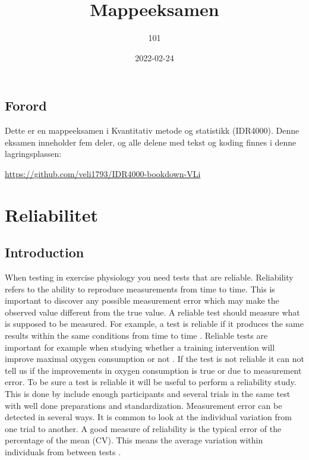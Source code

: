 \documentclass[
]{book}
\title{Mappeeksamen}
\author{101}
\date{2022-02-24}
\begin{document}
\maketitle

{
\setcounter{tocdepth}{1}
\tableofcontents
}
\hypertarget{forord}{%
\section{Forord}\label{forord}}

Dette er en mappeeksamen i Kvantitativ metode og statistikk (IDR4000). Denne eksamen inneholder fem deler, og alle delene med tekst og koding finnes i denne lagringsplassen:

\url{https://github.com/veli1793/IDR4000-bookdown-VLi}

\hypertarget{reliabilitet}{%
\chapter{Reliabilitet}\label{reliabilitet}}

\hypertarget{introduction}{%
\section{Introduction}\label{introduction}}

When testing in exercise physiology you need tests that are reliable. Reliability refers to the ability to reproduce measurements from time to time. This is important to discover any possible measurement error which may make the observed value different from the true value. A reliable test should measure what is supposed to be measured. For example, a test is reliable if it produces the same results within the same conditions from time to time \citet{hopkins2000}. Reliable tests are important for example when studying whether a training intervention will improve maximal oxygen consumption or not \citep{peng2006}. If the test is not reliable it can not tell us if the improvements in oxygen consumption is true or due to measurement error. To be sure a test is reliable it will be useful to perform a reliability study. This is done by include enough participants and several trials in the same test with well done preparations and standardization. Measurement error can be detected in several ways. It is common to look at the individual variation from one trial to another. A good measure of reliability is the typical error of the percentage of the mean (CV). This means the average variation within individuals from between tests \citep{hopkins2000}.
\end{document}
